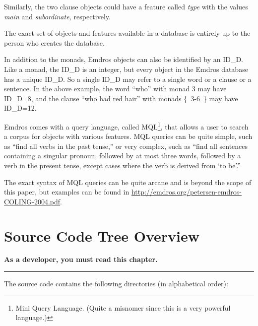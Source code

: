 \documentclass[11pt,oneside,a4paper]{memoir}
\begin{document}
Similarly, the two clause objects could have a feature called \emph{type} with the values
\emph{main} and \emph{subordinate,} respectively.

The exact set of objects and features available in a database is entirely up to the person who
creates the database.

In addition to the monads, Emdros objects can also be identified by an
ID\_D. Like a monad, the ID\_D is an integer, but
every object in the Emdros database has a unique ID\_D. So a single ID\_D may refer to a single word
or a clause or a sentence. In the above example, the word ``who'' with monad 3 may have ID\_D=8, and
the clause ``who had red hair'' with monads \{~3-6~\} may have ID\_D=12.

Emdros comes with a query language, called MQL\footnote{Mini Query Language.
  (Quite a misnomer since this is a very powerful language.)}, that allows a user to search a corpus
for objects with various features. MQL queries can be quite simple, such as ``find all verbs in the
past tense,'' or very complex, such as ``find all sentences containing a singular pronoun, followed
by at most three words, followed by a verb in the present tense, except cases where the verb is
derived from `to be'.''

The exact syntax of MQL queries can be quite arcane and is beyond the scope of this paper, but
examples can be found in \url{http://emdros.org/petersen-emdros-COLING-2004.pdf}.



\chapter{Source Code Tree Overview}

\textbf{As a developer, you must read this chapter.}
\plainbreak{3}

The source code contains the following directories (in alphabetical order):
\end{document}
